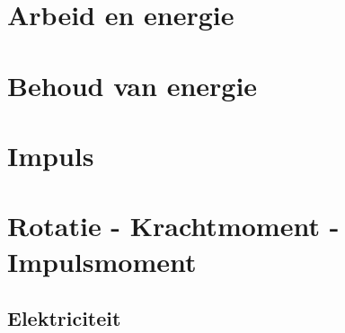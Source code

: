 \documentclass{exam}
\begin{document}
\newpage

\section{Arbeid en energie}

\vspace{0.5cm}



\newpage

\section{Behoud van energie}

\vspace{0.5cm}



\newpage

\section{Impuls}

\vspace{0.5cm}



\newpage

\section{Rotatie - Krachtmoment - Impulsmoment}

\vspace{0.5cm}



\newpage



% 


\vspace*{\fill}
\begin{center}
    
\section*{Elektriciteit}
\end{center}
\end{document}
